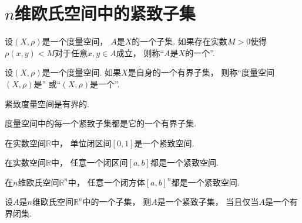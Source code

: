 \section{\texorpdfstring{$n$}{n}维欧氏空间中的紧致子集}
\begin{definition}
设\((X,\rho)\)是一个度量空间，
\(A\)是\(X\)的一个子集.
如果存在实数\(M>0\)使得\(\rho(x,y)<M\)对于任意\(x,y \in A\)成立，
则称“\(A\)是\(X\)的一个”.
\end{definition}
\begin{definition}
设\((X,\rho)\)是一个度量空间.
如果\(X\)是自身的一个有界子集，
则称“度量空间\((X,\rho)\)是”
或“\((X,\rho)\)是一个”.
\end{definition}

\begin{theorem}
紧致度量空间是有界的.
\end{theorem}

\begin{corollary}
度量空间中的每一个紧致子集都是它的一个有界子集.
\end{corollary}

\begin{lemma}
在实数空间\(\mathbb{R}\)中，
单位闭区间\([0,1]\)是一个紧致空间.
\end{lemma}

\begin{proposition}
在实数空间\(\mathbb{R}\)中，
任意一个闭区间\([a,b]\)都是一个紧致空间.
\end{proposition}

\begin{proposition}
在\(n\)维欧氏空间\(\mathbb{R}^n\)中，
任意一个闭方体\([a,b]^n\)都是一个紧致空间.
\end{proposition}

\begin{theorem}
设\(A\)是\(n\)维欧氏空间\(\mathbb{R}^n\)中的一个子集，
则\(A\)是一个紧致子集，
当且仅当\(A\)是一个有界闭集.
\end{theorem}

